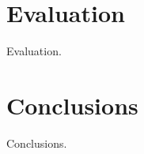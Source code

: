 \documentclass[letterpaper]{article}
\begin{document}
\section{Evaluation}


Evaluation.


\section{Conclusions}


Conclusions.




\end{document}
